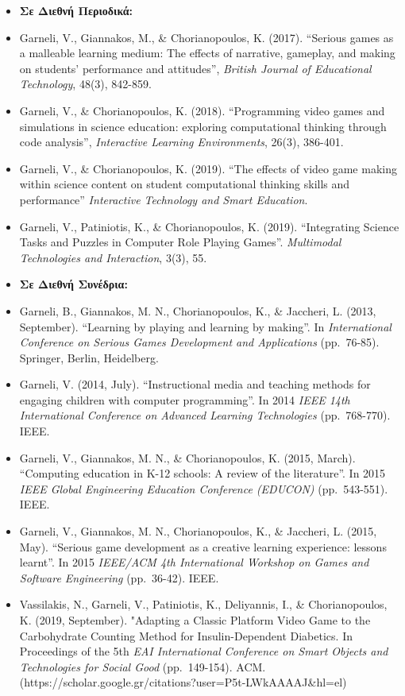 \documentclass[%
    11pt,
  oneside
  ]{memoir}
\begin{document}
\begin{itemize}
\tightlist
\item
  \textbf{Σε Διεθνή Περιοδικά:}
\item
  Garneli, V., Giannakos, M., \& Chorianopoulos, K. (2017). ``Serious
  games as a malleable learning medium: The effects of narrative,
  gameplay, and making on students' performance and attitudes'',
  \emph{British Journal of Educational Technology}, 48(3), 842-859.
\item
  Garneli, V., \& Chorianopoulos, K. (2018). ``Programming video games
  and simulations in science education: exploring computational thinking
  through code analysis'', \emph{Interactive Learning Environments},
  26(3), 386-401.
\item
  Garneli, V., \& Chorianopoulos, K. (2019). ``The effects of video game
  making within science content on student computational thinking skills
  and performance'' \emph{Interactive Technology and Smart Education}.
\item
  Garneli, V., Patiniotis, K., \& Chorianopoulos, K. (2019).
  ``Integrating Science Tasks and Puzzles in Computer Role Playing
  Games''. \emph{Multimodal Technologies and Interaction}, 3(3), 55.
\item
  \textbf{Σε Διεθνή Συνέδρια:}
\item
  Garneli, B., Giannakos, M. N., Chorianopoulos, K., \& Jaccheri, L.
  (2013, September). ``Learning by playing and learning by making''. In
  \emph{International Conference on Serious Games Development and
  Applications} (pp.~76-85). Springer, Berlin, Heidelberg.
\item
  Garneli, V. (2014, July). ``Instructional media and teaching methods
  for engaging children with computer programming''. In 2014 \emph{IEEE
  14th International Conference on Advanced Learning Technologies}
  (pp.~768-770). IEEE.
\item
  Garneli, V., Giannakos, M. N., \& Chorianopoulos, K. (2015, March).
  ``Computing education in K-12 schools: A review of the literature''.
  In 2015 \emph{IEEE Global Engineering Education Conference (EDUCON)}
  (pp.~543-551). IEEE.
\item
  Garneli, V., Giannakos, M. N., Chorianopoulos, K., \& Jaccheri, L.
  (2015, May). ``Serious game development as a creative learning
  experience: lessons learnt''. In 2015 \emph{IEEE/ACM 4th International
  Workshop on Games and Software Engineering} (pp.~36-42). IEEE.
\item
  Vassilakis, N., Garneli, V., Patiniotis, K., Deliyannis, I., \&
  Chorianopoulos, K. (2019, September). "Adapting a Classic Platform
  Video Game to the Carbohydrate Counting Method for Insulin-Dependent
  Diabetics. In Proceedings of the 5th \emph{EAI International
  Conference on Smart Objects and Technologies for Social Good}
  (pp.~149-154). ACM.
  (https://scholar.google.gr/citations?user=P5t-LWkAAAAJ\&hl=el)
\end{itemize}
\end{document}
